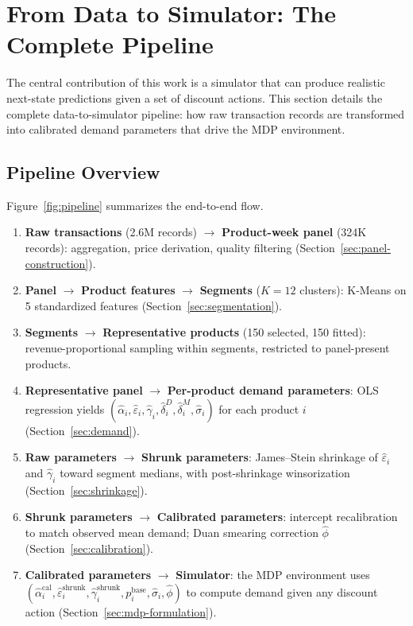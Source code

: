 \documentclass[12pt,a4paper]{article}
\begin{document}
\section{From Data to Simulator: The Complete Pipeline}
\label{sec:simulator}

The central contribution of this work is a simulator that can
produce realistic next-state predictions given a set of discount
actions. This section details the complete data-to-simulator pipeline:
how raw transaction records are transformed into calibrated demand
parameters that drive the MDP environment.

\subsection{Pipeline Overview}

Figure~\ref{fig:pipeline} summarizes the end-to-end flow.

\begin{enumerate}
\item \textbf{Raw transactions} (2.6M records) $\to$
\textbf{Product-week panel} (324K records): aggregation, price
derivation, quality filtering (Section~\ref{sec:panel-construction}).

\item \textbf{Panel} $\to$ \textbf{Product features} $\to$
\textbf{Segments} ($K=12$ clusters): K-Means on 5 standardized
features (Section~\ref{sec:segmentation}).

\item \textbf{Segments} $\to$ \textbf{Representative products}
(150 selected, 150 fitted): revenue-proportional sampling within
segments, restricted to panel-present products.

\item \textbf{Representative panel} $\to$ \textbf{Per-product
demand parameters}: OLS regression yields
$(\hat{\alpha}_i, \hat{\varepsilon}_i, \hat{\gamma}_i,
\hat{\delta}_i^D, \hat{\delta}_i^M, \hat{\sigma}_i)$ for each
product $i$ (Section~\ref{sec:demand}).

\item \textbf{Raw parameters} $\to$ \textbf{Shrunk parameters}:
James--Stein shrinkage of $\hat{\varepsilon}_i$ and $\hat{\gamma}_i$
toward segment medians, with post-shrinkage winsorization
(Section~\ref{sec:shrinkage}).

\item \textbf{Shrunk parameters} $\to$ \textbf{Calibrated parameters}:
intercept recalibration to match observed mean demand; Duan smearing
correction $\hat{\phi}$ (Section~\ref{sec:calibration}).

\item \textbf{Calibrated parameters} $\to$ \textbf{Simulator}: the
MDP environment uses
$(\hat{\alpha}_i^{\text{cal}}, \hat{\varepsilon}_i^{\text{shrunk}},
\hat{\gamma}_i^{\text{shrunk}}, p_i^{\text{base}},
\hat{\sigma}_i, \hat{\phi})$
to compute demand given any discount action
(Section~\ref{sec:mdp-formulation}).
\end{enumerate}
\end{document}
